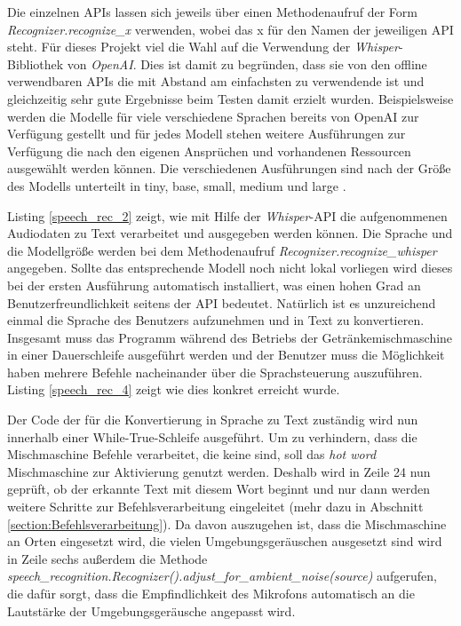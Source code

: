 Die einzelnen \ac{API}s lassen sich jeweils über einen Methodenaufruf der Form \textit{Recognizer.recognize\_x} verwenden, wobei das \glqq{}x\grqq{} für den Namen der jeweiligen \ac{API} steht. Für dieses Projekt viel die Wahl auf die Verwendung der \textit{Whisper}-Bibliothek von \textit{OpenAI}. Dies ist damit zu begründen, dass sie von den offline verwendbaren \ac{API}s die mit Abstand am einfachsten zu verwendende ist und gleichzeitig sehr gute Ergebnisse beim Testen damit erzielt wurden. Beispielsweise werden die Modelle für viele verschiedene Sprachen bereits von OpenAI zur Verfügung gestellt und für jedes Modell stehen weitere Ausführungen zur Verfügung die nach den eigenen Ansprüchen und vorhandenen Ressourcen ausgewählt werden können. Die verschiedenen Ausführungen sind nach der \glqq{}Größe\grqq{} des Modells unterteilt in \glqq{}tiny\grqq{}, \glqq{}base\grqq{}, \glqq{}small\grqq{}, \glqq{}medium\grqq{} und \glqq{}large\grqq{} \cite{whisper_repo}.

Listing \ref{speech_rec_2} zeigt, wie mit Hilfe der \textit{Whisper}-\ac{API} die aufgenommenen Audiodaten zu Text verarbeitet und ausgegeben werden können. Die Sprache und die Modellgröße werden bei dem Methodenaufruf \textit{Recognizer.recognize\_whisper} angegeben. Sollte das entsprechende Modell noch nicht lokal vorliegen wird dieses bei der ersten Ausführung automatisch installiert, was einen hohen Grad an Benutzerfreundlichkeit seitens der \ac{API} bedeutet. Natürlich ist es unzureichend einmal die Sprache des Benutzers aufzunehmen und in Text zu konvertieren. Insgesamt muss das Programm während des Betriebs der Getränkemischmaschine in einer Dauerschleife ausgeführt werden und der Benutzer muss die Möglichkeit haben mehrere Befehle nacheinander über die Sprachsteuerung auszuführen. Listing \ref{speech_rec_4} zeigt wie dies konkret erreicht wurde.
 
Der Code der für die Konvertierung in Sprache zu Text zuständig wird nun innerhalb einer While-True-Schleife ausgeführt. Um zu verhindern, dass die Mischmaschine Befehle verarbeitet, die keine sind, soll das \textit{hot word} \glqq{}Mischmaschine\grqq{} zur Aktivierung genutzt werden. Deshalb wird in Zeile 24 nun geprüft, ob der erkannte Text mit diesem Wort beginnt und nur dann werden weitere Schritte zur Befehlsverarbeitung eingeleitet (mehr dazu in Abschnitt \ref{section:Befehlsverarbeitung}). Da davon auszugehen ist, dass die Mischmaschine an Orten eingesetzt wird, die vielen Umgebungsgeräuschen ausgesetzt sind wird in Zeile sechs außerdem die Methode \textit{speech\_recognition.Recognizer().adjust\_for\_ambient\_noise(source)} aufgerufen, die dafür sorgt, dass die Empfindlichkeit des Mikrofons automatisch an die Lautstärke der Umgebungsgeräusche angepasst wird.
